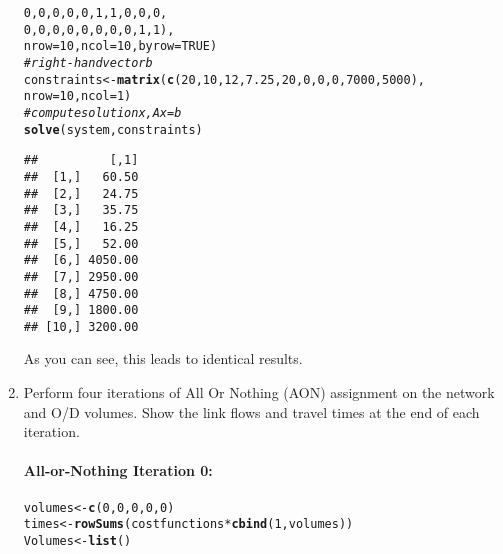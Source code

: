 \documentclass{texMemo}\usepackage[]{graphicx}\usepackage[]{color}
\makeatletter
\newcommand{\hlnum}[1]{\textcolor[rgb]{0.686,0.059,0.569}{#1}}%
\newcommand{\hlcom}[1]{\textcolor[rgb]{0.678,0.584,0.686}{\textit{#1}}}%
\newcommand{\hlopt}[1]{\textcolor[rgb]{0,0,0}{#1}}%
\newcommand{\hlstd}[1]{\textcolor[rgb]{0.345,0.345,0.345}{#1}}%
\newcommand{\hlkwb}[1]{\textcolor[rgb]{0.69,0.353,0.396}{#1}}%
\newcommand{\hlkwc}[1]{\textcolor[rgb]{0.333,0.667,0.333}{#1}}%
\newcommand{\hlkwd}[1]{\textcolor[rgb]{0.737,0.353,0.396}{\textbf{#1}}}%
\newenvironment{kframe}{%
 \def\at@end@of@kframe{}%
 \ifinner\ifhmode%
  \def\at@end@of@kframe{\end{minipage}}%
  \begin{minipage}{\columnwidth}%
 \fi\fi%
 \def\FrameCommand##1{\hskip\@totalleftmargin \hskip-\fboxsep
 \colorbox{shadecolor}{##1}\hskip-\fboxsep
     \hskip-\linewidth \hskip-\@totalleftmargin \hskip\columnwidth}%
 \MakeFramed {\advance\hsize-\width
   \@totalleftmargin\z@ \linewidth\hsize
   \@setminipage}}%
 {\par\unskip\endMakeFramed%
 \at@end@of@kframe}
\newenvironment{knitrout}{}{} %
\makeatother
\begin{document}
\begin{enumerate}
\begin{knitrout}
\begin{kframe}
\begin{alltt}
                   \hlnum{0}\hlstd{,} \hlnum{0}\hlstd{,} \hlnum{0}\hlstd{,} \hlnum{0}\hlstd{,} \hlnum{0}\hlstd{,} \hlnum{1}\hlstd{,}    \hlnum{1}\hlstd{,}     \hlnum{0}\hlstd{,}     \hlnum{0}\hlstd{,}     \hlnum{0}\hlstd{,}
                   \hlnum{0}\hlstd{,} \hlnum{0}\hlstd{,} \hlnum{0}\hlstd{,} \hlnum{0}\hlstd{,} \hlnum{0}\hlstd{,} \hlnum{0}\hlstd{,}    \hlnum{0}\hlstd{,}     \hlnum{0}\hlstd{,}     \hlnum{1}\hlstd{,}     \hlnum{1}\hlstd{),}
                 \hlkwc{nrow}\hlstd{=}\hlnum{10}\hlstd{,}\hlkwc{ncol}\hlstd{=}\hlnum{10}\hlstd{,} \hlkwc{byrow}\hlstd{=}\hlnum{TRUE}\hlstd{)}
\hlcom{# right-hand vector b}
\hlstd{constraints} \hlkwb{<-} \hlkwd{matrix}\hlstd{(}\hlkwd{c}\hlstd{(}\hlnum{20}\hlstd{,} \hlnum{10}\hlstd{,} \hlnum{12}\hlstd{,} \hlnum{7.25}\hlstd{,} \hlnum{20}\hlstd{,} \hlnum{0}\hlstd{,} \hlnum{0}\hlstd{,}\hlnum{0}\hlstd{,}\hlnum{7000}\hlstd{,}\hlnum{5000}\hlstd{),}
                      \hlkwc{nrow}\hlstd{=}\hlnum{10}\hlstd{,} \hlkwc{ncol}\hlstd{=}\hlnum{1}\hlstd{)}
\hlcom{# compute solution x, Ax=b}
\hlkwd{solve}\hlstd{(system, constraints)}
\end{alltt}
\begin{verbatim}
##          [,1]
##  [1,]   60.50
##  [2,]   24.75
##  [3,]   35.75
##  [4,]   16.25
##  [5,]   52.00
##  [6,] 4050.00
##  [7,] 2950.00
##  [8,] 4750.00
##  [9,] 1800.00
## [10,] 3200.00
\end{verbatim}
\end{kframe}
\end{knitrout}


As you can see, this leads to identical results.


\item{Perform four iterations of All Or Nothing (AON) assignment on the
network and  O/D volumes. Show the link flows and travel times at the 
end of each iteration.}

\paragraph{All-or-Nothing Iteration 0:}
\begin{knitrout}\small
{}\color{fgcolor}\begin{kframe}
\begin{alltt}
\hlstd{volumes} \hlkwb{<-} \hlkwd{c}\hlstd{(}\hlnum{0}\hlstd{,}\hlnum{0}\hlstd{,}\hlnum{0}\hlstd{,}\hlnum{0}\hlstd{,}\hlnum{0}\hlstd{)}
\hlstd{times} \hlkwb{<-} \hlkwd{rowSums}\hlstd{(costfunctions} \hlopt{*} \hlkwd{cbind}\hlstd{(}\hlnum{1}\hlstd{, volumes))}
\hlstd{Volumes} \hlkwb{<-} \hlkwd{list}\hlstd{()}
\end{alltt}
\end{kframe}
\end{knitrout}



\end{enumerate}
\end{document}
